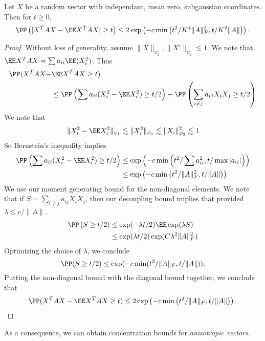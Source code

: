 \begin{theorem}
    Let $X$ be a random vector with independant, mean zero, subgaussian coordinates. Then for $t \geq 0$,
    \[ \PP \left( |X^T A X - \EE X^T A X| \geq t \right) \leq 2 \exp\left( -c \min \left( t^2/K^4 \| A \|_F^2, t/K^2 \| A \| \right) \right). \]
\end{theorem}
\begin{proof}
    Without loss of generality, assume $\| X \|_{\psi_2}, \| X' \|_{\psi_2} \lesssim 1$. We note that $\EE X^T A X = \sum a_{ii} \EE(X_i^2)$. Thus
    \begin{align*}
        \PP(X^T A X - &\EE X^T A X \geq t)\\
        &\leq \PP \left(\sum a_{ii}(X_i^2 - \EE X_i^2) \geq t/2 \right) + \PP \left(\sum_{i \neq j} a_{ij} X_i X_j \geq t/2 \right)
    \end{align*}
    We note that
    \[ \| X_i^2 - \EE X_i^2 \|_{\psi_1} \lesssim \| X_i^2 \|_{\psi_1} \lesssim \| X_i \|_{\psi_2}^2 \lesssim 1 \]
    So Bernstein's inequality implies
    \begin{align*}
        \PP \left( \sum a_{ii}(X_i^2 - \EE X_i^2) \geq t/2 \right) &\leq \exp \left( -c \min \left( t^2 / \sum a_{ii}^2, t/\max |a_{ii}| \right) \right)\\
        &\leq \exp \left( -c \min \left(t^2/ \|A \|_F^2, t/\|A\| \right) \right)
    \end{align*}
    We use our moment generating bound for the non-diagonal elements. We note that if $S = \sum_{i \neq j} a_{ij} X_i X_j$, then our decoupling bound implies that provided $\lambda \leq c / \| A \|$.
    \begin{align*}
        \PP \left( S \geq t/2 \right) &\leq \exp(-\lambda t / 2) \EE \exp(\lambda S)\\
        &\leq \exp(\lambda t/2) \exp(C \lambda^2 \| A \|_F^2)
    \end{align*}
    Optimizing the choice of $\lambda$, we conclude
    \[ \PP(S \geq t/2) \leq \exp(-c \min(t^2/ \| A \|_F, t/\|A\|)). \]
    Putting the non-diagonal bound with the diagonal bound together, we conclude that
    \[ \PP (X^T A X - \EE X^T A X \geq t) \leq 2 \exp \left(-c \min \left(t^2/\|A \|_F, t/\|A\| \right) \right). \qedhere \]
\end{proof}

As a consequence, we can obtain concentration bounds for {\it anisotropic vectors}.


